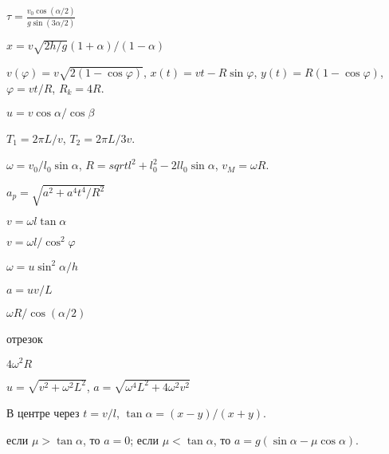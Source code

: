 \begin{Answer}{33}
$\tau = \frac{v_0 \cos (\alpha /2)}{g \sin (3\alpha / 2)}$
\end{Answer}
\begin{Answer}{34}
$x = v \sqrt{2h/g} \left( 1 + \alpha \right) / \left( 1 - \alpha \right)$
\end{Answer}
\begin{Answer}{35}
$v(\varphi) = v\sqrt{2(1- \cos \varphi)}$, $x(t) = vt - R \sin \varphi$, $y(t) = R(1 - \cos \varphi)$, $\varphi = vt / R$, $R_k = 4R$.
\end{Answer}
\begin{Answer}{36}
$u = v \cos \alpha / \cos \beta$
\end{Answer}
\begin{Answer}{37}
$T_1 = 2 \pi L/v$, $T_2 = 2 \pi L/3v$.
\end{Answer}
\begin{Answer}{38}
$\omega = v_0/l_0 \sin \alpha$, $R = sqrt{l^2 + l_0^2 - 2ll_0 \sin \alpha}$, $v_M = \omega R$.
\end{Answer}
\begin{Answer}{39}
$a_p = \sqrt{a^2 + a^4t^4/R^2}$
\end{Answer}
\begin{Answer}{40}
$v = \omega l \tan \alpha$
\end{Answer}
\begin{Answer}{41}
$v = \omega l/ \cos^2 \varphi$
\end{Answer}
\begin{Answer}{42}
$\omega = u \sin^2 \alpha /h$
\end{Answer}
\begin{Answer}{43}
$a = uv/L$
\end{Answer}
\begin{Answer}{44}
$\omega R/ \cos (\alpha /2)$
\end{Answer}
\begin{Answer}{45}
отрезок
\end{Answer}
\begin{Answer}{46}
$4 \omega^2 R$
\end{Answer}
\begin{Answer}{47}
$u = \sqrt{v^2 + \omega^2 L^2}$, $a = \sqrt{\omega^4 L^2 + 4\omega^2 v^2}$
\end{Answer}
\begin{Answer}{48}
В центре через $t = v/l$, $\tan \alpha = (x-y)/(x+y)$.
\end{Answer}
\begin{Answer}{49}
если $\mu > \tan \alpha$, то $a = 0$; если $\mu < \tan \alpha$, то $a = g(\sin \alpha - \mu \cos \alpha)$.
\end{Answer}
